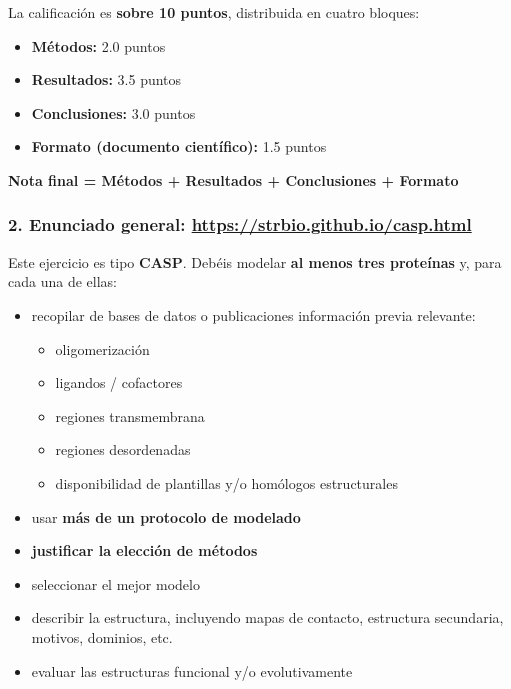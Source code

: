 \documentclass[
  11pt,
  a4paper,
  twoside]{scrreprt}
\providecommand{\tightlist}{%
  \setlength{\itemsep}{0pt}\setlength{\parskip}{0pt}}
\begin{document}
La calificación es \textbf{sobre 10 puntos}, distribuida en cuatro
bloques:

\begin{itemize}
\item
  \textbf{Métodos:} 2.0 puntos
\item
  \textbf{Resultados:} 3.5 puntos
\item
  \textbf{Conclusiones:} 3.0 puntos
\item
  \textbf{Formato (documento científico):} 1.5 puntos
\end{itemize}

\textbf{Nota final = Métodos + Resultados + Conclusiones + Formato}

\subsubsection{\texorpdfstring{2. Enunciado general:
\url{https://strbio.github.io/casp.html}}{2. Enunciado general: https://strbio.github.io/casp.html}}\label{enunciado-general-httpsstrbio.github.iocasp.html}

Este ejercicio es tipo \textbf{CASP}. Debéis modelar \textbf{al menos
tres proteínas} y, para cada una de ellas:

\begin{itemize}
\item
  recopilar de bases de datos o publicaciones información previa
  relevante:

  \begin{itemize}
  \tightlist
  \item
    oligomerización
  \item
    ligandos / cofactores
  \item
    regiones transmembrana
  \item
    regiones desordenadas
  \item
    disponibilidad de plantillas y/o homólogos estructurales
  \end{itemize}
\item
  usar \textbf{más de un protocolo de modelado}
\item
  \textbf{justificar la elección de métodos}
\item
  seleccionar el mejor modelo
\item
  describir la estructura, incluyendo mapas de contacto, estructura
  secundaria, motivos, dominios, etc.
\item
  evaluar las estructuras funcional y/o evolutivamente
\end{itemize}
\end{document}
